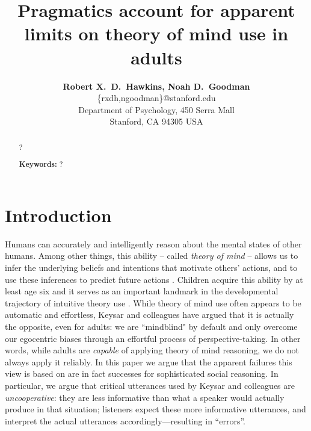 \documentclass[10pt,letterpaper]{article}
\title{Pragmatics account for apparent limits on theory of mind use in adults}
\author{{\large \bf Robert X.~D.~Hawkins, Noah D.~Goodman}\\
  \{rxdh,ngoodman\}@stanford.edu\\
  Department of Psychology, 450 Serra Mall \\
  Stanford, CA 94305 USA}
\begin{document}
\maketitle

\begin{abstract}
?

\textbf{Keywords:} 
?
\end{abstract}

\section{Introduction}
\label{sec:intro}

Humans can accurately and intelligently reason about the mental states of other humans. Among other things, this ability -- called \emph{theory of mind} \cite{PremackWoodruff78_ChimpanzeeToM} -- allows us to infer the underlying beliefs and intentions that motivate others' actions, and to use these inferences to predict future actions \cite{BakerSaxeTenenbaum09_ActionUnderstandingInversePlanning}. Children acquire this ability by at least age six \cite{WimmerPerner83_BeliefsAboutBeliefs, WellmanCrossWatson01_ToMMetaAnalysis} and it serves as an important landmark in the developmental trajectory of intuitive theory use \cite{GopnikWellman12_ReconstructingConstructivism}.
%
While theory of mind use often appears to be automatic and effortless, Keysar and colleagues \cite{KeysarBarr___Brauner00_TakingPerspective, KeysarLinBarr03_LimitsOnTheoryOfMindUse, LinKeysarEpley10_ReflexivelyMindblind} have argued that it is actually the opposite, even for adults: we are ``mindblind" by default and only overcome our egocentric biases through an effortful process of perspective-taking. In other words, while adults are \emph{capable} of applying theory of mind reasoning, we do not always apply it reliably. 
In this paper we argue that the apparent failures this view is based on are in fact successes for sophisticated social reasoning. 
In particular, we argue that critical utterances used by Keysar and colleagues are \emph{uncooperative}: they are less informative than what a speaker would actually produce in that situation; listeners expect these more informative utterances, and interpret the actual utterances accordingly---resulting in ``errors''.
\end{document}
